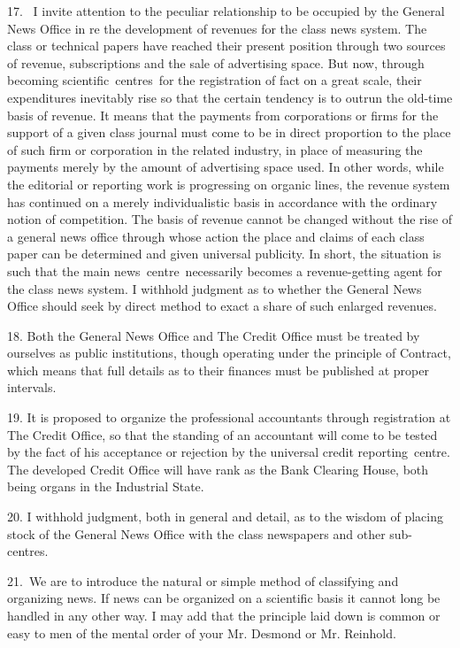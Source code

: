 \documentclass[twoside,symmetric,nobib,justified]{tufte-book}
\begin{document}
17. ~I invite attention to the peculiar relationship to be occupied by
the General News Office in re the development of revenues for the class
news system. The class or technical papers have reached their present
position through two sources of revenue, subscriptions and the sale of
advertising space. But now, through becoming scientific~centres~for the
registration of fact on a great scale, their expenditures inevitably
rise so that the certain tendency is to outrun the old-time basis of
revenue. It means that the payments from corporations or firms for the
support of a given class journal must come to be in direct proportion to
the place of such firm or corporation in the related industry, in place
of measuring the payments merely by the amount of advertising space
used. In other words, while the editorial or reporting work is
progressing on organic lines, the revenue system has continued on a
merely individualistic basis in accordance with the ordinary notion of
competition. The basis of revenue cannot be changed without the rise of
a general news office through whose action the place and claims of each
class paper can be determined and given universal publicity. In short,
the situation is such that the main news~centre~necessarily becomes a
revenue-getting agent for the class news system. I withhold judgment as
to whether the General News Office should seek by direct method to exact
a share of such enlarged revenues.~

18. Both the General News Office and The Credit Office must be treated
by ourselves as public institutions, though operating under the
principle of Contract, which means that full details as to their
finances must be published at proper intervals.~

19. It is proposed to organize the professional accountants through
registration at The Credit Office, so that the standing of an accountant
will come to be tested by the fact of his acceptance or rejection by the
universal credit reporting~centre. The developed Credit Office will have
rank as the Bank Clearing House, both being organs in the Industrial
State.~

20. I withhold judgment, both in general and detail, as to the wisdom of
placing stock of the General News Office with the class newspapers and
other sub-centres.~

21.~We are to introduce the natural or simple method of classifying and
organizing news. If news can be organized on a scientific basis it
cannot long be handled in any other way. I may add that the principle
laid down is common or easy to men of the mental order of your Mr.
Desmond or Mr. Reinhold.
\end{document}
